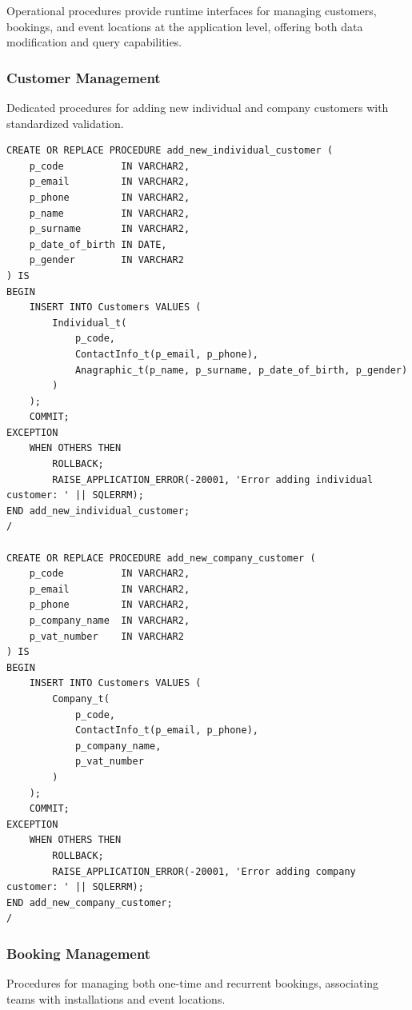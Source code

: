 Operational procedures provide runtime interfaces for managing customers, bookings, and event locations at the application level, offering both data modification and query capabilities.

\subsubsection{Customer Management}
Dedicated procedures for adding new individual and company customers with standardized validation.

\begin{verbatim}
CREATE OR REPLACE PROCEDURE add_new_individual_customer (
    p_code          IN VARCHAR2,
    p_email         IN VARCHAR2,
    p_phone         IN VARCHAR2,
    p_name          IN VARCHAR2,
    p_surname       IN VARCHAR2,
    p_date_of_birth IN DATE,
    p_gender        IN VARCHAR2
) IS
BEGIN
    INSERT INTO Customers VALUES (
        Individual_t(
            p_code, 
            ContactInfo_t(p_email, p_phone), 
            Anagraphic_t(p_name, p_surname, p_date_of_birth, p_gender)
        )
    );
    COMMIT;
EXCEPTION
    WHEN OTHERS THEN
        ROLLBACK;
        RAISE_APPLICATION_ERROR(-20001, 'Error adding individual customer: ' || SQLERRM);
END add_new_individual_customer;
/

CREATE OR REPLACE PROCEDURE add_new_company_customer (
    p_code          IN VARCHAR2,
    p_email         IN VARCHAR2,
    p_phone         IN VARCHAR2,
    p_company_name  IN VARCHAR2,
    p_vat_number    IN VARCHAR2
) IS
BEGIN
    INSERT INTO Customers VALUES (
        Company_t(
            p_code, 
            ContactInfo_t(p_email, p_phone), 
            p_company_name, 
            p_vat_number
        )
    );
    COMMIT;
EXCEPTION
    WHEN OTHERS THEN
        ROLLBACK;
        RAISE_APPLICATION_ERROR(-20001, 'Error adding company customer: ' || SQLERRM);
END add_new_company_customer;
/
\end{verbatim}

\subsubsection{Booking Management}
Procedures for managing both one-time and recurrent bookings, associating teams with installations and event locations.

